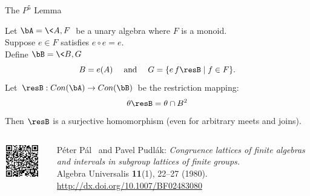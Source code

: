 \begin{frame}[fragile,label=P5Lemma]{The $P^5$ Lemma}
\begin{lemma}
 Let  $\bA = \<A, F\>$ be  a  unary  algebra  where  $F$  is  a  monoid.\\[5pt]
 Suppose $e \in F$ satisfies $e\circ e = e$.\\[5pt]
 Define  $\bB = \<B, G\>$
 \[
 B=e(A) \quad \text{ and } \quad  
 G = \{e\,f\resB \mid f\in F\}.
 \]
 Let $\resB :  Con (\bA)\rightarrow Con (\bB)$  be the restriction mapping:
\[
\theta \resB = \theta \cap B^2
\]
Then  $\resB$  is  a  surjective  homomorphism  
(even  for  arbitrary meets  and  joins). 
\end{lemma}
\vskip1cm
  \begin{columns}
    \begin{column}{0.2\textwidth}
      \begin{flushright}
        \includegraphics[height=1.5cm]{inputs/qrcodeP5}
      \end{flushright}
    \end{column}
      \begin{column}{0.9\textwidth}
{\small P{\'e}ter P{\'a}l \Palfy\ and Pavel Pudl{\'a}k: {\it Congruence lattices of finite algebras\\ and
  intervals in subgroup lattices of finite groups.}\\[4pt]
 Algebra Universalis \textbf{11}(1), 22--27 (1980).\\
\url{http://dx.doi.org/10.1007/BF02483080}}
      \end{column}
    \end{columns}


\end{frame}

